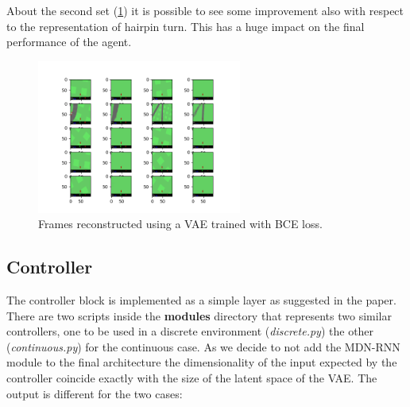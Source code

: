 \documentclass[10pt,a4paper]{article}
\begin{document}

\noindent About the second set (\ref{fig:vaebce}) it is possible to see some improvement also with respect to the representation of hairpin turn. This has a huge impact on the final performance of the agent.

\begin{figure}[h!]
    \centering
    \includegraphics[width=0.6\textwidth]{images/bce/good.png}
    \caption{Frames reconstructed using a VAE trained with BCE loss.}
    \label{fig:vaebce}
\end{figure}



\newpage
\subsection*{Controller}
The controller block is implemented as a simple  layer as suggested in the paper. There are two scripts inside the \textbf{modules} directory that represents two similar controllers, one to be used in a discrete environment (\textit{discrete.py}) the other (\textit{continuous.py}) for the continuous case. As we decide to not add the MDN-RNN module to the final architecture the dimensionality  of the input expected by the controller coincide exactly with the size of the latent space of the VAE. The output is different for the two cases:\\
\end{document}
